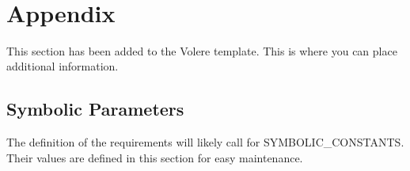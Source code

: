 \documentclass[12pt, titlepage]{article}
\begin{document}
\newpage

\





\newpage

\section{Appendix}

This section has been added to the Volere template.  This is where you can place
additional information.

	\subsection{Symbolic Parameters}

	The definition of the requirements will likely call for SYMBOLIC\_CONSTANTS.
	Their values are defined in this section for easy maintenance.
\end{document}

